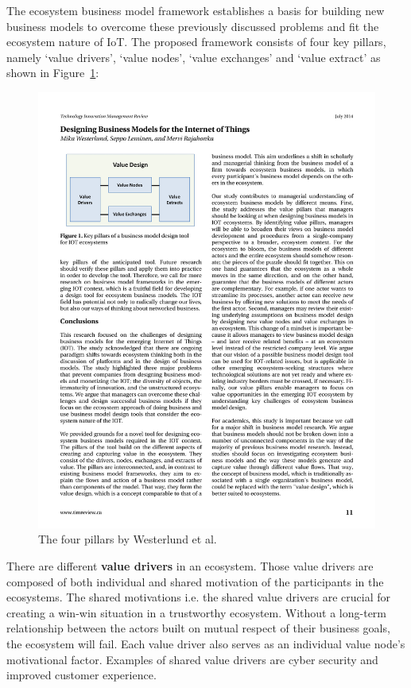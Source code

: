 		\vspace{-1em}
		The ecosystem business model framework establishes a basis for building new business models to overcome these previously discussed problems and fit the ecosystem nature of IoT. The proposed framework consists of four key pillars, namely `value drivers', `value nodes', `value exchanges' and `value extract' as shown in Figure~\ref{Westerlund pillars}:

			\begin{figure}[ht]
			    \begin{center}
			    \includegraphics[scale=1.2]{Talk11/westerlundpillars.pdf}
			    \end{center}
			    \caption{The four pillars by Westerlund et al. \cite{westerlund}}
			    \label{Westerlund pillars}
			\end{figure}
		There are different \textbf{value drivers} in an ecosystem. Those value drivers are composed of both individual and shared motivation of the participants in the ecosystems. The shared motivations i.e. the shared value drivers are crucial for creating a win-win situation in a trustworthy ecosystem. Without a long-term relationship between the actors built on mutual respect of their business goals, the ecosystem will fail. Each value driver also serves as an individual value node's motivational factor. Examples of shared value drivers are cyber security and improved customer experience.\\
